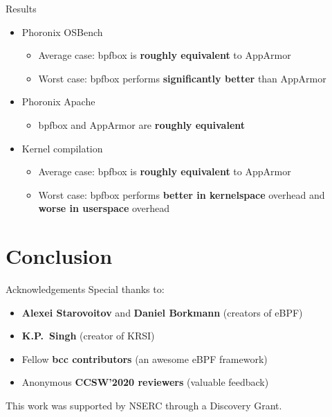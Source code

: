 \documentclass[12pt, dvipsnames]{beamer}
\begin{document}
\begin{frame}[c]{Results}
\begin{itemize}
    \item Phoronix OSBench
    \begin{itemize}
        \item Average case: bpfbox is \textbf{roughly equivalent} to AppArmor
        \item Worst case: bpfbox performs \textbf{significantly better} than AppArmor
    \end{itemize}

    \vfill
    \item Phoronix Apache
    \begin{itemize}
        \item bpfbox and AppArmor are \textbf{roughly equivalent}
    \end{itemize}

    \vfill
    \item Kernel compilation
    \begin{itemize}
        \item Average case: bpfbox is \textbf{roughly equivalent} to AppArmor
        \item Worst case: bpfbox performs \textbf{better in kernelspace} overhead and \textbf{worse in userspace} overhead
    \end{itemize}
\end{itemize}
\end{frame}

\section{Conclusion}

\begin{frame}[c]{Acknowledgements}
Special thanks to:
\begin{itemize}
    \item \textbf{Alexei Starovoitov} and \textbf{Daniel Borkmann} (creators of eBPF)
    \item \textbf{K.P.~Singh} (creator of KRSI)
    \item Fellow \textbf{bcc contributors} (an awesome eBPF framework)
    \item Anonymous \textbf{CCSW'2020 reviewers} (valuable feedback)
\end{itemize}
\vfill
This work was supported by NSERC through a Discovery Grant.
\end{frame}
\end{document}
